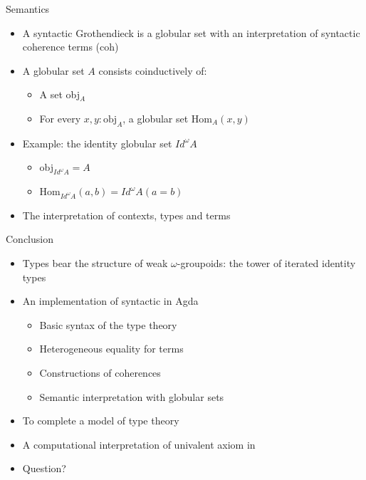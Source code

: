 \documentclass[12pt, mathserif,handout]{beamer}
\begin{document}
\begin{frame}{Semantics}

\begin{itemize}

\item A syntactic Grothendieck \wog is a globular set with an
  interpretation of syntactic coherence terms (coh)

\item A globular set $A$ consists coinductively of:
\begin{itemize}
\item A set obj$_{A}$
\item For every $x,y : \text{obj}_{A}$, a globular set Hom$_{A}(x, y)$
\end{itemize}

\item  Example: the identity globular set $Id^{\omega} A$
\begin{itemize}
\item obj$_{Id^{\omega} A} = A$
\item Hom$_{Id^{\omega} A}(a, b) = Id^{\omega} A (a = b)$
\end{itemize}

\item The interpretation of contexts, types and terms

\end{itemize}

\end{frame}











\begin{frame}{Conclusion}


\begin{itemize}

\item Types bear the structure of weak $\omega$-groupoids: the tower
  of iterated identity types

\item An implementation of syntactic \wog in Agda
  \begin{itemize}
  \item {Basic syntax of the type theory \tig}
  \item Heterogeneous equality for terms
  \item Constructions of coherences
  \item Semantic interpretation with globular sets
  \end{itemize}

\item To complete a \wogs model of type theory
\item A computational interpretation of univalent axiom in \itt


\item Question?
\end{itemize}


\end{frame}
\end{document}
